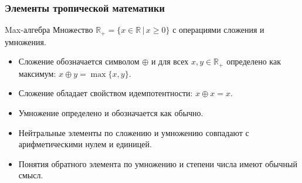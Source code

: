 \documentclass[ucs, notheorems, handout]{beamer}
\begin{document}
\begin{frame}
    \frametitle{Элементы тропической математики}
    \begin{block}{Max-алгебра}
        Множество $\mathbb{R}_+ = \{x \in \mathbb{R} \, |\, x \geq 0\}$ с операциями сложения и умножения.
    \end{block}
    \begin{itemize}
        \item Сложение обозначается символом $\oplus$ и для всех $x,y\in\mathbb{R}_{+}$ определено как максимум: $x\oplus y=\max\{x,y\}$.
        \item Сложение обладает свойством идемпотентности: $x\oplus x=x$.
        \item Умножение определено и обозначается как обычно.
        \item Нейтральные элементы по сложению и умножению совпадают с арифметическими нулем и единицей.
        \item Понятия обратного элемента по умножению и степени числа имеют обычный смысл. 
    \end{itemize}

\end{frame}
\end{document}

